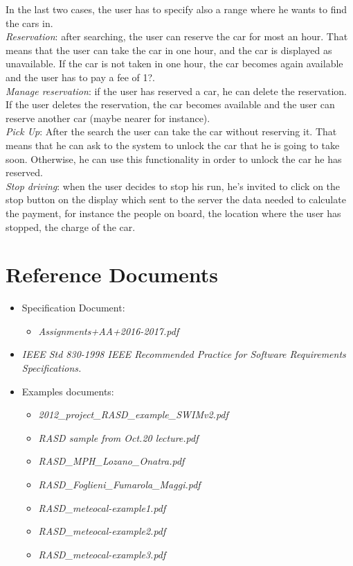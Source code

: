 \documentclass[11pt,a4paper]{report}
\begin{document}
	In the last two cases, the user has to specify also a range where he wants to find the cars in.\\
\textit{Reservation}: after searching, the user can reserve the car for most an hour. That means that the user can take the car in one hour, and the car is displayed as unavailable. If the car is not taken in one hour, the car becomes again available and the user has to pay a fee of 1?. \\
\textit{Manage reservation}: if the user has reserved a car, he can delete the reservation. If the user deletes the reservation, the car becomes available and the user can reserve another car (maybe nearer for instance).\\
\textit{Pick Up}: After the search the user can take the car without reserving it. That means that he can ask to the system to unlock the car that he is going to take soon. Otherwise, he can use this functionality in order to unlock the car he has reserved.\\
\textit{Stop driving}: when the user decides to stop his run, he's invited to click on the stop button on the display which sent to the server the data needed to calculate the payment, for instance the people on board, the location where the user has stopped, the charge of the car.\\

\section{Reference Documents}
	\begin{itemize}
		\item Specification Document:
		\begin{itemize}
			\item \textit{Assignments+AA+2016-2017.pdf}
		\end{itemize}
		\item \textit{IEEE Std 830-1998 IEEE Recommended Practice for Software Requirements Specifications.}
		\item Examples documents:
		\begin{itemize}
			\item \textit{2012\_project\_RASD\_example\_SWIMv2.pdf}
			\item \textit{RASD sample from Oct.20 lecture.pdf}
			\item \textit{RASD\_MPH\_Lozano\_Onatra.pdf}
			\item \textit{RASD\_Foglieni\_Fumarola\_Maggi.pdf}
			\item \textit{RASD\_meteocal-example1.pdf}
			\item \textit{RASD\_meteocal-example2.pdf}
			\item \textit{RASD\_meteocal-example3.pdf}
		\end{itemize}
	\end{itemize}
\end{document}
